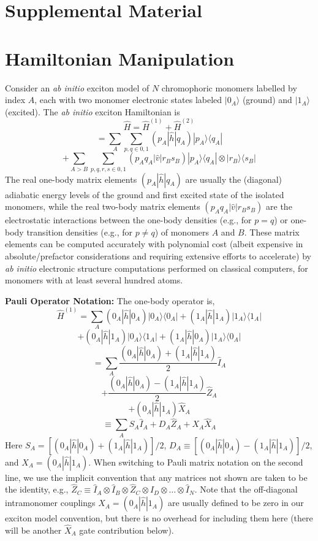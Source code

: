 \section{Supplemental Material}

\section{Hamiltonian Manipulation}

Consider an \emph{ab initio} exciton model of $N$ chromophoric monomers labelled
by index $A$, each with two monomer electronic states labeled $|0_A\rangle$
(ground) and $|1_A\rangle$ (excited). The \emph{ab initio} exciton Hamiltonian
is
\begin{equation}
\label{eq:H}
\hat H
=
\hat H^{(1)}
+
\hat H^{(2)}
\end{equation}
\[
=
\sum_{A}
\sum_{p,q \in 0,1}
(p_{A} | \hat h | q_{A})
| p_{A} \rangle
\langle q_{A} |
\]
\[
+
\sum_{A>B}
\sum_{p,q,r,s \in 0,1}
(p_{A} q_{A} | \hat v | r_{B} s_{B})
|p_{A} \rangle
\langle q_{A} |
\otimes
|r_{B} \rangle
\langle s_{B} |
\]
The real one-body matrix elements $(p_A|\hat h|q_A)$ are usually the 
(diagonal) adiabatic energy levels of the ground and first excited state of the
isolated monomers, while the real two-body matrix elements $(p_A q_A|\hat v|r_B
s_B)$ are the electrostatic interactions between the one-body densities (e.g.,
for $p = q$) or one-body transition densities (e.g., for $p \neq q$) of monomers
$A$ and $B$.  These matrix elements can be computed accurately with polynomial
cost (albeit expensive in absolute/prefactor considerations and requiring
extensive efforts to accelerate) by \emph{ab initio} electronic structure
computations performed on classical computers, for monomers with at least
several hundred atoms. 

\textbf{Pauli Operator Notation:} The one-body operator is,
\begin{equation}
\hat H^{(1)}
=
\sum_{A}
(0_A | \hat h | 0_A) | 0_A \rangle \langle 0_A |
+
(1_A | \hat h | 1_A) | 1_A \rangle \langle 1_A |
\end{equation}
\[
+
(0_A | \hat h | 1_A) | 0_A \rangle \langle 1_A |
+
(1_A | \hat h | 0_A) | 1_A \rangle \langle 0_A |
\]
\[
=
\sum_{A}
\frac{(0_A|\hat h|0_A) + (1_A|\hat h|1_A)}{2} \hat I_{A}
\]
\[
+
\frac{(0_A|\hat h|0_A) - (1_A|\hat h|1_A)}{2} \hat Z_{A}
\]
\[
+ (0_A|\hat h|1_A) \hat X_{A}
\]
\[
\equiv
\sum_{A}
S_A \hat I_{A}
+
D_A \hat Z_{A}
+
X_A \hat X_{A}
\]
Here $S_{A} = [(0_A | \hat h | 0_A) +
(1_A | \hat h | 1_A)] / 2$, $D_{A} \equiv [(0_A | \hat h | 0_A) - (1_A | \hat h
| 1_A)] / 2$, and $X_{A} = (0_A | \hat h | 1_A)$. When switching to Pauli matrix
notation on the second line, we use the implicit convention that any matrices
not shown are taken to be the identity, e.g., $\hat Z_{C} \equiv \hat I_{A}
\otimes \hat I_{B} \otimes \hat Z_{C} \otimes I_{D} \otimes \ldots \otimes \hat
I_{N}$. Note that the off-diagonal intramonomer couplings $X_A = (0_A | \hat h |
1_A)$ are usually defined to be zero in our exciton model convention, but there
is no overhead for including them here (there will be another $\hat X_A$ gate
contribution below).

